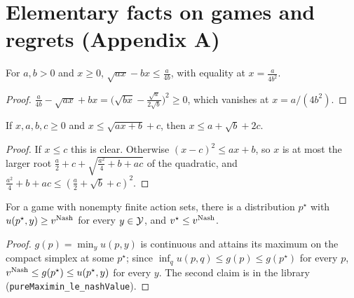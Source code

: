 \chapter{Elementary facts on games and regrets (Appendix A)}
\label{chap:games}

\begin{lemma}[Lemma 7]
  \label{lem:sqrt_func}
  \leanok
  For $a, b > 0$ and $x \ge 0$, $\sqrt{a x} - b x \le \frac{a}{4b}$, with equality at
  $x = \frac{a}{4b^2}$.
\end{lemma}

\begin{proof}
  \leanok
  $\frac{a}{4b} - \sqrt{ax} + bx = \bigl(\sqrt{bx} - \frac{\sqrt a}{2\sqrt b}\bigr)^2 \ge 0$, which
  vanishes at $x = a/(4b^2)$.
\end{proof}

\begin{lemma}
  \label{lem:self_bound}
  \leanok
  If $x, a, b, c \ge 0$ and $x \le \sqrt{a x + b} + c$, then $x \le a + \sqrt b + 2c$.
\end{lemma}

\begin{proof}
  \leanok
  If $x \le c$ this is clear. Otherwise $(x - c)^2 \le a x + b$, so $x$ is at most the larger root
  $\frac a2 + c + \sqrt{\frac{a^2}{4} + b + ac}$ of the quadratic, and
  $\frac{a^2}{4} + b + ac \le (\frac a2 + \sqrt b + c)^2$.
\end{proof}

\begin{lemma}
  \label{lem:maximin_attained}
  \leanok
  For a game with nonempty finite action sets, there is a distribution $p^\star$ with
  $u(p^\star, y) \ge v^{\mathrm{Nash}}$ for every $y \in \mathcal{Y}$, and $v^\star \le v^{\mathrm{Nash}}$.
\end{lemma}

\begin{proof}
  \leanok
  $g(p) = \min_y u(p, y)$ is continuous and attains its maximum on the compact simplex at some
  $p^\star$; since $\inf_q u(p, q) \le g(p) \le g(p^\star)$ for every $p$, $v^{\mathrm{Nash}} \le g(p^\star)
  \le u(p^\star, y)$ for every $y$. The second claim is in the library
  (\texttt{pureMaximin\_le\_nashValue}).
\end{proof}

